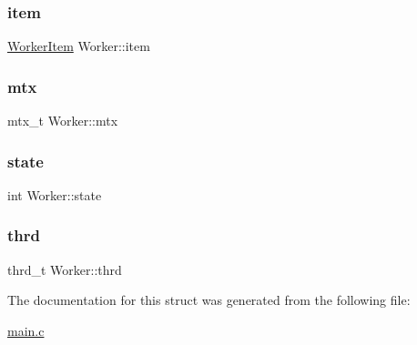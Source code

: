\mbox{\label{structWorker_a5543b8205b70f14eaf07a15bd255580a}} 
\subsubsection{\texorpdfstring{item}{item}}
{\footnotesize\ttfamily \hyperlink{structWorkerItem}{Worker\+Item} Worker\+::item}

\mbox{\label{structWorker_a94f77d872408098dc5ff3d6380161c96}} 
\subsubsection{\texorpdfstring{mtx}{mtx}}
{\footnotesize\ttfamily mtx\+\_\+t Worker\+::mtx}

\mbox{\label{structWorker_a1003e459fb7686782b33812bc9bbe95c}} 
\subsubsection{\texorpdfstring{state}{state}}
{\footnotesize\ttfamily int Worker\+::state}

\mbox{\label{structWorker_aadc19b994d770006cb5303fa46a257f8}} 
\subsubsection{\texorpdfstring{thrd}{thrd}}
{\footnotesize\ttfamily thrd\+\_\+t Worker\+::thrd}



The documentation for this struct was generated from the following file\+:\begin{DoxyCompactItemize}
\item 
\hyperlink{main_8c}{main.\+c}\end{DoxyCompactItemize}
